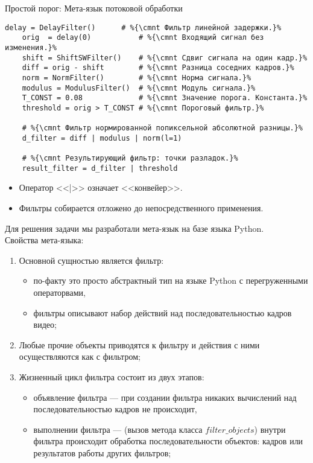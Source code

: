 \begin{frame}[fragile]{Простой порог: Мета-язык потоковой обработки}
    \begin{lstlisting}[language=FilterPython]
    delay = DelayFilter()      # %{\cmnt Фильтр линейной задержки.}%
    orig  = delay(0)           # %{\cmnt Входящий сигнал без изменения.}%
    shift = ShiftSWFilter()    # %{\cmnt Сдвиг сигнала на один кадр.}%
    diff = orig - shift        # %{\cmnt Разница соседних кадров.}%
    norm = NormFilter()        # %{\cmnt Норма сигнала.}%
    modulus = ModulusFilter()  # %{\cmnt Модуль сигнала.}%
    T_CONST = 0.08             # %{\cmnt Значение порога. Константа.}%
    threshold = orig > T_CONST # %{\cmnt Пороговый фильтр.}%
    
    # %{\cmnt Фильтр нормированной попиксельной абсолютной разницы.}%
    d_filter = diff | modulus | norm(l=1)
    
    # %{\cmnt Результирующий фильтр: точки разладок.}%
    result_filter = d_filter | threshold
    \end{lstlisting}
    \begin{itemize}
        \item Оператор <<|>> означает <<конвейер>>.
        \item Фильтры собирается отложено 
                до непосредственного применения.
    \end{itemize}
\end{frame}

\begin{noteframe}
    Для решения задачи мы разработали мета-язык 
    на базе языка Python.\\
    Свойства мета-языка:
    \begin{enumerate}
        \item Основной сущностью является фильтр:
        \begin{itemize}
            \item по-факту это просто абстрактный тип 
            на языке Python с перегруженными операторвами,
            \item фильтры описывают набор действий 
            над последовательностью кадров видео;
        \end{itemize}
        \item Любые прочие объекты приводятся к фильтру и действия с ними осуществляются как с фильтром;
        \item Жизненный цикл фильтра состоит из двух этапов:
        \begin{itemize}
            \item объявление фильтра — при создании фильтра никаких вычислений над последовательностью кадров не происходит,
            \item выполнении фильтра —
            (вызов метода класса $filter\_objects$) 
            внутри фильтра происходит обработка 
            последовательности объектов: 
            кадров или результатов работы других фильтров;
        \end{itemize}
    \end{enumerate}
\end{noteframe}


